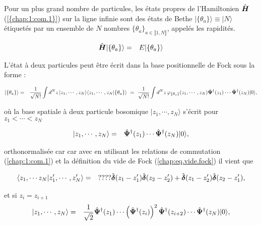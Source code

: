 Pour un plus grand nombre de particules, les états propres de l'Hamiltonien \(\hat{\bm{H}}\) (\ref{{chap:1:com.1}}) sur la ligne infinie sont des états de Bethe $\vert \{\theta_a\}\rangle \equiv \vert N \rangle $ étiquetés par un ensemble de $N$ nombres $\{\theta_a\}_{a \in \llbracket 1 , N \rrbracket } $, appelés les rapidités. %

\begin{eqnarray}
	\hat{\bm{H}} \vert \{\theta_a\}\rangle & = & E \vert \{\theta_a\}\rangle 		
\end{eqnarray}

L’état à deux particules peut être écrit dans la base positionnelle de Fock sous la forme :

\begin{eqnarray}
	\vert \{\theta_a\} \rangle & = & \frac{1}{\sqrt{N!}}\int d^Nz \, \vert z_1 , \cdots , z_N \rangle \langle z_1 , \cdots , z_N  \vert \{\theta_a\}  \rangle ~=~\frac{1}{\sqrt{N!}} \int d^Nz \, \varphi_{\{\theta_a\}}(z_1, \cdots ,  z_N) \hat{\bm{\Psi}}^\dag(z_1) \cdots  \hat{\bm{\Psi}}^\dag(z_N) \vert 0 \rangle, \label{chap:1:N.part}
\end{eqnarray}

où la base spatiale à deux particule bosomique $\vert z_1 , \cdots ,  z_N \rangle$ s'écrit pour $z_1 < \cdots <  z_N$

\begin{eqnarray}
	\vert z_1 , \cdots ,  z_N  \rangle  & = &  \hat{\bm{\Psi}}^\dag(z_1) \cdots \hat{\bm{\Psi}}^\dag(z_N) \vert 0 \rangle ,
\end{eqnarray}

orthonormalisée car car avec en utilisant les relations de commutation (\ref{chap:1:com.1})  et la définition du vide de Fock (\ref{chap:eq.vide.fock}) il vient que 

\begin{eqnarray}
	\langle z_1 , \cdots z_N \vert z_1' ,  \cdots , z_N' \rangle  & = & ???? \hat{\bm{\delta}}(z_1 -z_1')\hat{\bm{\delta}}(z_2 -z_2')  +   \hat{\bm{\delta}}(z_1 -z_2')\hat{\bm{\delta}}(z_2 -z_1'),
\end{eqnarray}

et si $z_i =  z_{i+1} $
\begin{eqnarray}
	\vert z_1 , \cdots ,  z_N  \rangle  & = &  \frac{1}{\sqrt{2}} \hat{\bm{\Psi}}^\dag(z_1) \cdots \left(\hat{\bm{\Psi}}^\dag(z_i)\right)^2\hat{\bm{\Psi}}^\dag(z_{i+2}) \cdots \hat{\bm{\Psi}}^\dag(z_N) \vert 0 \rangle ,
\end{eqnarray}

